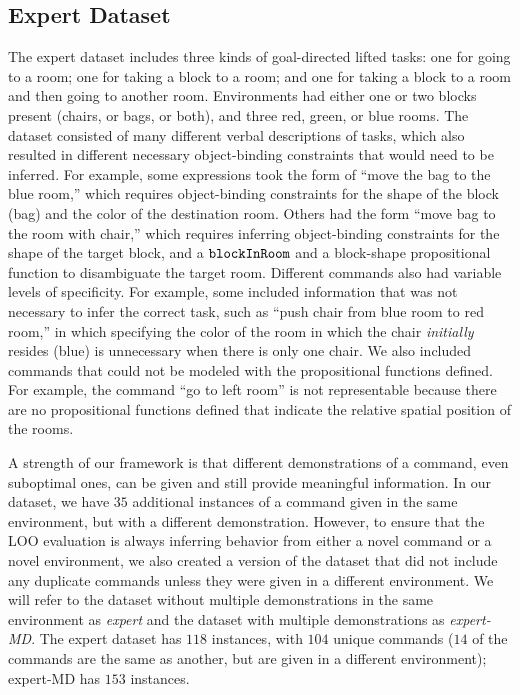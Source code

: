 \documentclass[conference]{IEEEtran}
\begin{document}
\subsection{Expert Dataset}
The expert dataset includes three kinds of goal-directed lifted tasks: one for going to a room; one for taking a block to a room; and one for taking a block to a room and then going to another room. Environments had either one or two blocks present (chairs, or bags, or both), and three red, green, or blue rooms.
The dataset consisted of many different verbal descriptions of tasks, which also resulted in different necessary object-binding constraints that would need to be inferred. 
For example, some expressions took the form of ``move the bag to the blue room,'' which requires object-binding constraints for the shape of the block (bag) and the color of the destination room. Others had the form ``move bag to the room with chair,''
which requires inferring object-binding constraints for the shape of the target block, and a ${\tt blockInRoom}$ and a block-shape propositional function to disambiguate the target room. Different commands also had variable levels of specificity. For example, some included information that was not necessary to infer the correct task, such as ``push chair from blue room to red room,'' in which specifying the color of the room in which the chair {\em initially} resides (blue) is unnecessary when there is only one chair. We also included commands that could not be modeled with the propositional functions defined. For example, the command ``go to left room'' is not representable because there are no propositional functions defined that indicate the relative spatial position of the rooms.%

A strength of our framework is that different demonstrations of a command, even suboptimal ones, can be given and still provide meaningful information. In our dataset, we have $35$ additional instances of a command given in the same environment, but with a different demonstration. However, to ensure that the LOO evaluation is always inferring behavior from either a novel command or a novel environment, we also created a version of the dataset that did not include any duplicate commands unless they were given in a different environment. We will refer to the dataset without multiple demonstrations in the same environment as {\em expert} and the dataset with multiple demonstrations as {\em expert-MD}. The expert dataset has $118$ instances, with $104$ unique commands ($14$ of the commands are the same as another, but are given in a different environment); expert-MD has $153$ instances. %
\end{document}
